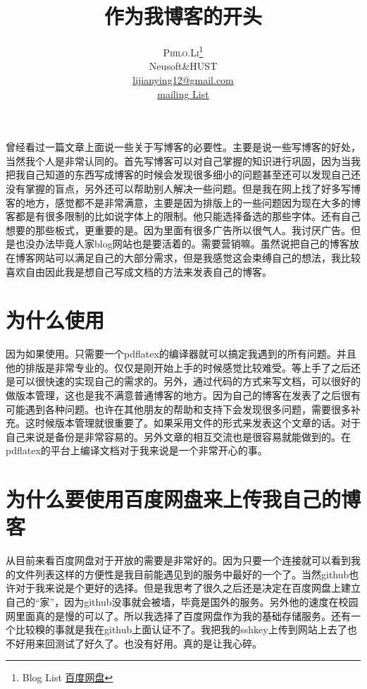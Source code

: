 \documentclass[twoside]{article}
\title{\vspace{-15mm}%
	\fontsize{24pt}{10pt}\selectfont
	\textbf{作为我博客的开头}
	}
\author{%
	\large
	\textsc{Philo.Li}\thanks{Blog List \href{http://pan.baidu.com/share/link?shareid=447381&uk=1174529285}{百度网盘}} \\[2mm]
	\normalsize	Neusoft\&HUST\\
	\normalsize	\href{mailto:lijianyin12@gmail.com}{lijianying12@gmail.com} \\
	\normalsize    \href{http://list.qq.com/cgi-bin/qf_invite?id=3d1e7484dfbdb88f545e4d8f053df370fe9cc5b9e7a60e07}{mailing List}
	\vspace{-5mm}
	}
\date{}
\begin{document}
\begin{CJK*}{UTF8}{gbsn}

\maketitle
\thispagestyle{fancy}

	

\begin{multicols}{2}
曾经看过一篇文章上面说一些关于写博客的必要性。主要是说一些写博客的好处，当然我个人是非常认同的。首先写博客可以对自己掌握的知识进行巩固，因为当我把我自己知道的东西写成博客的时候会发现很多细小的问题甚至还可以发现自己还没有掌握的盲点，另外还可以帮助别人解决一些问题。但是我在网上找了好多写博客的地方，感觉都不是非常满意，主要是因为排版上的一些问题因为现在大多的博客都是有很多限制的比如说字体上的限制。他只能选择备选的那些字体。还有自己想要的那些板式，更重要的是。因为里面有很多广告所以很气人。我讨厌广告。但是也没办法毕竟人家blog网站也是要活着的。需要营销嘛。虽然说把自己的博客放在博客网站可以满足自己的大部分需求，但是我感觉这会束缚自己的想法，我比较喜欢自由因此我是想自己写成文档的方法来发表自己的博客。

\section{为什么使用}
因为如果使用。只需要一个pdflatex的编译器就可以搞定我遇到的所有问题。并且他的排版是非常专业的。仅仅是刚开始上手的时候感觉比较难受。等上手了之后还是可以很快速的实现自己的需求的。另外，通过代码的方式来写文档，可以很好的做版本管理，这也是我不满意普通博客的地方。因为自己的博客在发表了之后很有可能遇到各种问题。也许在其他朋友的帮助和支持下会发现很多问题，需要很多补充。这时候版本管理就很重要了。如果采用文件的形式来发表这个文章的话。对于自己来说是备份是非常容易的。另外文章的相互交流也是很容易就能做到的。在pdflatex的平台上编译文档对于我来说是一个非常开心的事。

\section{为什么要使用百度网盘来上传我自己的博客}

从目前来看百度网盘对于开放的需要是非常好的。因为只要一个连接就可以看到我的文件列表这样的方便性是我目前能遇见到的服务中最好的一个了。当然github也许对于我来说是个更好的选择。但是我思考了很久之后还是决定在百度网盘上建立自己的“家”，因为github没事就会被墙，毕竟是国外的服务。另外他的速度在校园网里面真的是慢的可以了。所以我选择了百度网盘作为我的基础存储服务。还有一个比较糗的事就是我在github上面认证不了。我把我的sshkey上传到网站上去了也不好用来回测试了好久了。也没有好用。真的是让我心碎。


\end{multicols}
\end{CJK*}
\end{document}
